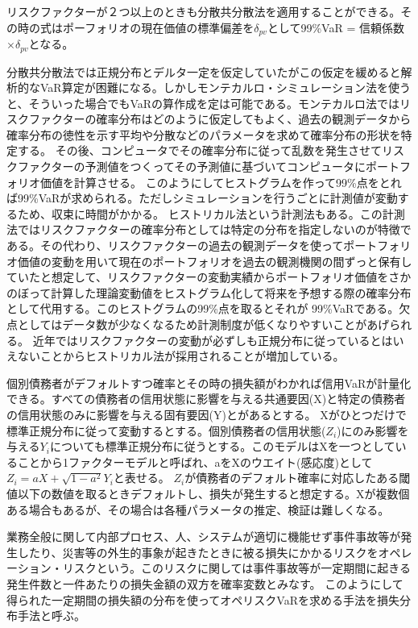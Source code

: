 \documentclass[12pt]{jsarticle}
\begin{document}
リスクファクターが２つ以上のときも分散共分散法を適用することができる。その時の式はポーフォリオの現在価値の標準偏差を$\delta_{pv}$として99\%VaR = 信頼係数  $\times {\delta}_{pv}$となる。\par
分散共分散法では正規分布とデルタ一定を仮定していたがこの仮定を緩めると解析的なVaR算定が困難になる。しかしモンテカルロ・シミュレーション法を使うと、そういった場合でもVaRの算作成を定は可能である。モンテカルロ法ではリスクファクターの確率分布はどのように仮定してもよく、過去の観測データから確率分布の徳性を示す平均や分散などのパラメータを求めて確率分布の形状を特定する。
その後、コンピュータでその確率分布に従って乱数を発生させてリスクファクターの予測値をつくってその予測値に基づいてコンピュータにポートフォリオ価値を計算させる。
このようにしてヒストグラムを作って99\%点をとれば99\%VaRが求められる。ただしシミュレーションを行うごとに計測値が変動するため、収束に時間がかかる。
ヒストリカル法という計測法もある。この計測法ではリスクファクターの確率分布としては特定の分布を指定しないのが特徴である。その代わり、リスクファクターの過去の観測データを使ってポートフォリオ価値の変動を用いて現在のポートフォリオを過去の観測機関の間ずっと保有していたと想定して、リスクファクターの変動実績からポートフォリオ価値をさかのぼって計算した理論変動値をヒストグラム化して将来を予想する際の確率分布として代用する。このヒストグラムの99\%点を取るとそれが
99\%VaRである。欠点としてはデータ数が少なくなるため計測制度が低くなりやすいことがあげられる。
近年ではリスクファクターの変動が必ずしも正規分布に従っているとはいえないことからヒストリカル法が採用されることが増加している。\par
個別債務者がデフォルトすつ確率とその時の損失額がわかれば信用VaRが計量化できる。すべての債務者の信用状態に影響を与える共通要因(X)と特定の債務者の信用状態のみに影響を与える固有要因(Y)とがあるとする。
Xがひとつだけで標準正規分布に従って変動するとする。個別債務者の信用状態($Z_i$)にのみ影響を与える$Y_i$についても標準正規分布に従うとする。このモデルはXを一つとしていることから1ファクターモデルと呼ばれ、aをXのウエイト(感応度)として$Z_i = aX + \sqrt{1 - a^2}Y_i$と表せる。
$Z_i$が債務者のデフォルト確率に対応したある閾値以下の数値を取るときデフォルトし、損失が発生すると想定する。Xが複数個ある場合もあるが、その場合は各種パラメータの推定、検証は難しくなる。\par
業務全般に関して内部プロセス、人、システムが適切に機能せず事件事故等が発生したり、災害等の外生的事象が起きたときに被る損失にかかるリスクをオペレーション・リスクという。このリスクに関しては事件事故等が一定期間に起きる発生件数と一件あたりの損失金額の双方を確率変数とみなす。
このようにして得られた一定期間の損失額の分布を使ってオペリスクVaRを求める手法を損失分布手法と呼ぶ。\par
\end{document}
